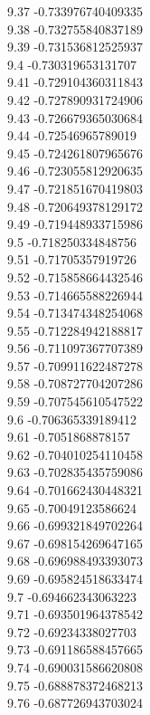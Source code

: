 {9.37	-0.733976740409335\\
9.38	-0.732755840837189\\
9.39	-0.731536812525937\\
9.4	-0.730319653131707\\
9.41	-0.729104360311843\\
9.42	-0.727890931724906\\
9.43	-0.726679365030684\\
9.44	-0.72546965789019\\
9.45	-0.724261807965676\\
9.46	-0.723055812920635\\
9.47	-0.721851670419803\\
9.48	-0.720649378129172\\
9.49	-0.719448933715986\\
9.5	-0.718250334848756\\
9.51	-0.71705357919726\\
9.52	-0.715858664432546\\
9.53	-0.714665588226944\\
9.54	-0.713474348254068\\
9.55	-0.712284942188817\\
9.56	-0.711097367707389\\
9.57	-0.709911622487278\\
9.58	-0.708727704207286\\
9.59	-0.707545610547522\\
9.6	-0.706365339189412\\
9.61	-0.7051868878157\\
9.62	-0.704010254110458\\
9.63	-0.702835435759086\\
9.64	-0.701662430448321\\
9.65	-0.70049123586624\\
9.66	-0.699321849702264\\
9.67	-0.698154269647165\\
9.68	-0.696988493393073\\
9.69	-0.695824518633474\\
9.7	-0.694662343063223\\
9.71	-0.693501964378542\\
9.72	-0.69234338027703\\
9.73	-0.691186588457665\\
9.74	-0.690031586620808\\
9.75	-0.688878372468213\\
9.76	-0.687726943703024\\
}
